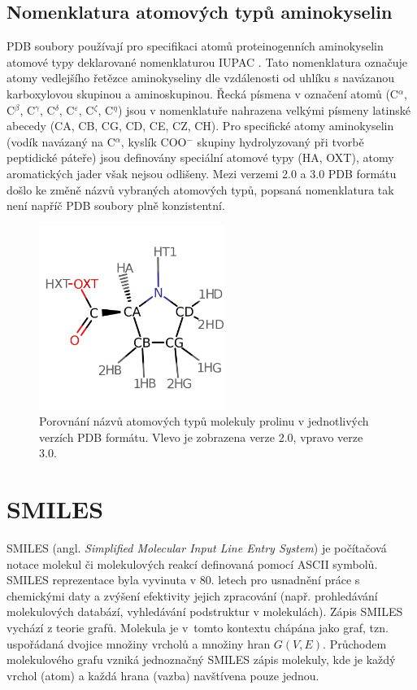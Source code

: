 \subsection{Nomenklatura atomových typů aminokyselin}
PDB soubory používají pro specifikaci atomů proteinogenních aminokyselin atomové typy deklarované nomenklaturou IUPAC \cite{AA_nomenclature}. Tato nomenklatura označuje atomy vedlejšího řetězce aminokyseliny dle vzdálenosti od uhlíku s navázanou karboxylovou skupinou a aminoskupinou. Řecká písmena v označení atomů (C$^\alpha$, C$^\beta$, C$^\gamma$, C$^\delta$, C$^\varepsilon$, C$^\zeta$, C$^\eta$) jsou v nomenklatuře nahrazena velkými písmeny latinské abecedy (CA, CB, CG, CD, CE, CZ, CH). Pro specifické atomy aminokyselin (vodík navázaný na C$^\alpha$, kyslík COO$^-$ skupiny hydrolyzovaný při tvorbě peptidické páteře) jsou definovány speciální atomové typy (HA, OXT), atomy aromatických jader však nejsou odlišeny. Mezi verzemi 2.0 a 3.0 PDB formátu došlo ke změně názvů vybraných atomových typů, popsaná nomenklatura tak není napříč PDB soubory plně konzistentní. 

\begin{figure}[h]
\begin{center}
\includegraphics[width=6cm]{pictures/prolin_base_v2.png}
\caption{Porovnání názvů atomových typů molekuly prolinu v jednotlivých verzích PDB formátu. Vlevo je zobrazena verze 2.0, vpravo verze 3.0.}
\end{center}
\end{figure}

\section{SMILES}
SMILES \cite{Weininger, Bunin, Leach_chemo} (angl. \textit{Simplified Molecular Input Line Entry System}) je počítačová notace molekul či molekulových reakcí definovaná pomocí ASCII symbolů. SMILES reprezentace byla vyvinuta v 80. letech pro usnadnění práce s chemickými daty  a zvýšení efektivity jejich zpracování (např. prohledávání molekulových databází, vyhledávání podstruktur v molekulách). Zápis SMILES vychází z teorie grafů. Molekula je v~tomto kontextu chápána jako graf, tzn. uspořádaná dvojice množiny vrcholů a množiny hran $G(V,E)$. Průchodem molekulového grafu vzniká jednoznačný SMILES zápis molekuly, kde je každý vrchol (atom) a každá hrana (vazba) navštívena pouze jednou.


